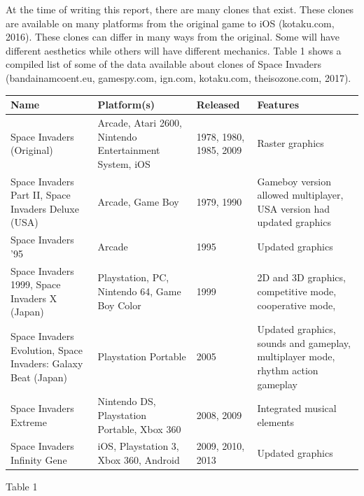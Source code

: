 \documentclass[12pt]{article}
\begin{document}
At the time of writing this report, there are many clones that exist. These clones are available on many platforms from the original game to iOS (kotaku.com, 2016). These clones can differ in many ways from the original. Some will have different aesthetics while others will have different mechanics. Table 1 shows a compiled list of some of the data available about clones of Space Invaders (bandainamcoent.eu, gamespy.com, ign.com, kotaku.com, theisozone.com, 2017).

\begin{center}
    \begin{tabular}{ | p{3cm} | p{2.5cm} | p{2cm} | p{4cm} |} \hline
    Name & Platform(s) & Released & Features \\ \hline
    Space Invaders (Original) & Arcade, Atari 2600, Nintendo Entertainment System, iOS & 1978, 1980, 1985, 2009 & Raster graphics \\ \hline
    
    Space Invaders Part II, Space Invaders Deluxe (USA) & Arcade, Game Boy & 1979, 1990 & Gameboy version allowed multiplayer, USA version had updated graphics\\ \hline
    
    Space Invaders '95 & Arcade & 1995 & Updated graphics  \\ \hline
    
	Space Invaders 1999, Space Invaders X (Japan) & Playstation, PC, Nintendo 64, Game Boy Color & 1999 & 2D and 3D graphics, competitive mode, cooperative mode,   \\ \hline 
	
	Space Invaders Evolution, Space Invaders: Galaxy Beat (Japan) & Playstation Portable & 2005 & Updated graphics, sounds and gameplay, multiplayer mode, rhythm action gameplay \\ \hline
	
	Space Invaders Extreme & Nintendo DS, Playstation Portable, Xbox 360 & 2008, 2009 & Integrated musical elements \\ \hline
	
	Space Invaders Infinity Gene & iOS, Playstation 3, Xbox 360, Android & 2009, 2010, 2013 & Updated graphics\\ \hline
    \end{tabular}
\end{center}

\begin{center}
Table 1
\end{center}

\newpage
\end{document}
